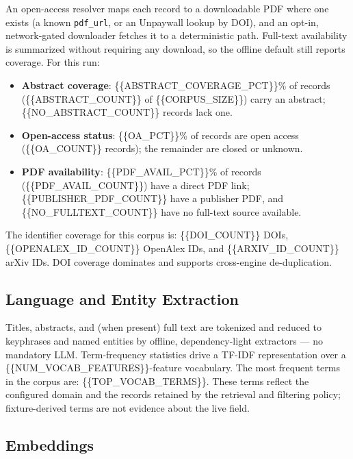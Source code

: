 \documentclass[
]{article}
\providecommand{\tightlist}{%
  \setlength{\itemsep}{0pt}\setlength{\parskip}{0pt}}
\begin{document}
An open-access resolver maps each record to a downloadable PDF where one
exists (a known \texttt{pdf\_url}, or an Unpaywall lookup by DOI), and
an opt-in, network-gated downloader fetches it to a deterministic path.
Full-text availability is summarized without requiring any download, so
the offline default still reports coverage. For this run:

\begin{itemize}
\tightlist
\item
  \textbf{Abstract coverage}: \{\{ABSTRACT\_COVERAGE\_PCT\}\}\% of
  records (\{\{ABSTRACT\_COUNT\}\} of \{\{CORPUS\_SIZE\}\}) carry an
  abstract; \{\{NO\_ABSTRACT\_COUNT\}\} records lack one.
\item
  \textbf{Open-access status}: \{\{OA\_PCT\}\}\% of records are open
  access (\{\{OA\_COUNT\}\} records); the remainder are closed or
  unknown.
\item
  \textbf{PDF availability}: \{\{PDF\_AVAIL\_PCT\}\}\% of records
  (\{\{PDF\_AVAIL\_COUNT\}\}) have a direct PDF link;
  \{\{PUBLISHER\_PDF\_COUNT\}\} have a publisher PDF, and
  \{\{NO\_FULLTEXT\_COUNT\}\} have no full-text source available.
\end{itemize}

The identifier coverage for this corpus is: \{\{DOI\_COUNT\}\} DOIs,
\{\{OPENALEX\_ID\_COUNT\}\} OpenAlex IDs, and \{\{ARXIV\_ID\_COUNT\}\}
arXiv IDs. DOI coverage dominates and supports cross-engine
de-duplication.

\subsection{Language and Entity
Extraction}\label{language-and-entity-extraction}

Titles, abstracts, and (when present) full text are tokenized and
reduced to keyphrases and named entities by offline, dependency-light
extractors --- no mandatory LLM. Term-frequency statistics drive a
TF-IDF representation over a \{\{NUM\_VOCAB\_FEATURES\}\}-feature
vocabulary. The most frequent terms in the corpus are:
\{\{TOP\_VOCAB\_TERMS\}\}. These terms reflect the configured domain and
the records retained by the retrieval and filtering policy;
fixture-derived terms are not evidence about the live field.

\subsection{Embeddings}\label{embeddings}
\end{document}
